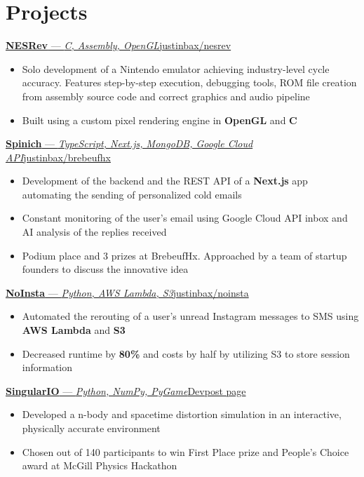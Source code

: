 \documentclass{article}
\newcommand{\shortlinkrole}[4]{
    {\href{#3}{\normalfont\textbf{#1} --- \textit{#2}\hfill#4\:\faExternalLink}\vspace*{-4pt}}
}
\newenvironment{bulletpoints}{\begin{itemize}\setlength\itemsep{-0.2em}}{\end{itemize}}
\begin{document}
\section*{Projects}

\shortlinkrole{NESRev}{C, Assembly, OpenGL}{https://github.com/justinbax/nesrev}{justinbax/nesrev}
\begin{bulletpoints}
    \item Solo development of a Nintendo emulator achieving industry-level cycle accuracy. Features step-by-step execution, debugging tools, ROM file creation from assembly source code and correct graphics and audio pipeline
    \item Built using a custom pixel rendering engine in \textbf{OpenGL} and \textbf{C}
\end{bulletpoints}

\shortlinkrole{Spinich}{TypeScript, Next.js, MongoDB, Google Cloud API}{https://github.com/justinbax/brebeufhx}{justinbax/brebeufhx}
\begin{bulletpoints}
    \item Development of the backend and the REST API of a \textbf{Next.js} app automating the sending of personalized cold emails
    \item Constant monitoring of the user's email using Google Cloud API inbox and AI analysis of the replies received
    \item Podium place and 3 prizes at BrebeufHx. Approached by a team of startup founders to discuss the innovative idea
\end{bulletpoints}

\shortlinkrole{NoInsta}{Python, AWS Lambda, S3}{https://github.com/justinbax/brebeufhx}{justinbax/noinsta}
\begin{bulletpoints}
    \item Automated the rerouting of a user's unread Instagram messages to SMS using \textbf{AWS Lambda} and \textbf{S3}
    \item Decreased runtime by \textbf{80\%} and costs by half by utilizing S3 to store session information
\end{bulletpoints}

\shortlinkrole{SingularIO}{Python, NumPy, PyGame}{https://devpost.com/software/singulario}{Devpost page}
\begin{bulletpoints}
    \item Developed a n-body and spacetime distortion simulation in an interactive, physically accurate environment
    \item Chosen out of 140 participants to win First Place prize and People's Choice award at McGill Physics Hackathon
\end{bulletpoints}
\end{document}

